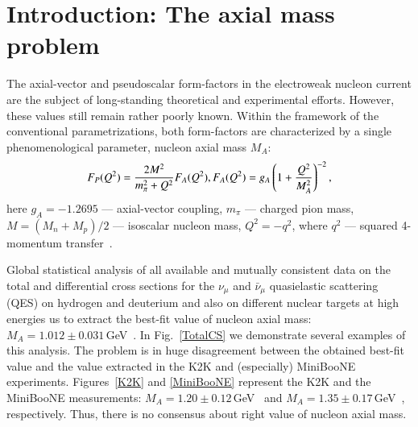 \section{Introduction: The axial mass problem}
The axial-vector and pseudoscalar form-factors in the electroweak nucleon current are the subject of long-standing theoretical and experimental efforts. However, these values still remain rather poorly known. Within the framework of the conventional parametrizations, both form-factors are characterized by a single phenomenological parameter, nucleon axial mass $M_{A}$:
\begin{equation}
F_{P}(Q^{2})={}\frac{2M^{2}}{m_{\pi}^{2}+Q^{2}}F_{A}(Q^{2}),\\
F_{A}(Q^{2})={}g_{A}\left(1+\frac{Q^{2}}{M_{A}^{2}}\right)^{-2},
\label{formfactors}
\end{equation}
here $g_{A}=-1.2695$ --- axial-vector coupling, $m_{\pi}$ --- charged pion mass, $M=(M_{n}+M_{p})/2$ --- isoscalar nucleon mass, $Q^{2}=-q^{2}$, where $q^{2}$ --- squared 4-momentum transfer~\cite{Kuzmin:2007kr}.

Global statistical analysis of all available and mutually consistent data on the total and differential cross sections for the $\nu_{\mu}$ and $\bar\nu_{\mu}$ quasielastic scattering (QES) on hydrogen and deuterium and also on different nuclear targets at high energies us to extract the best-fit value of nucleon axial mass: $M_{A}=1.012\pm0.031$\,GeV~\cite{Kuzmin:2014}. In Fig.~\ref{TotalCS} we demonstrate several examples of this analysis. The problem is in huge disagreement between the obtained best-fit value and the value extracted in the K2K and (especially) MiniBooNE experiments. Figures~\ref{K2K} and \ref{MiniBooNE} represent the K2K and the MiniBooNE measurements: $M_{A}=1.20\pm0.12$\,GeV~\cite{Gran:2006jn} and $M_{A}=1.35\pm0.17$\,GeV~\cite{AguilarArevalo:2010zc}, respectively. Thus, there is no consensus about right value of nucleon axial mass.

